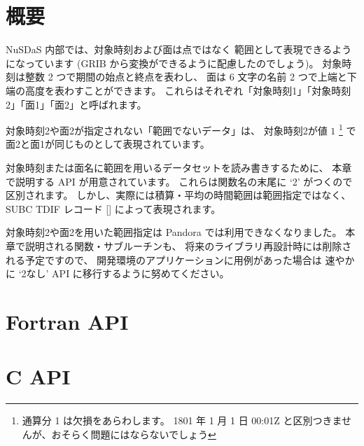 \label{api2}

\section{概要}

NuSDaS 内部では、対象時刻および面は点ではなく
範囲として表現できるようになっています
(GRIB から変換ができるように配慮したのでしょう)。
対象時刻は整数 2 つで期間の始点と終点を表わし、
面は 6 文字の名前 2 つで上端と下端の高度を表わすことができます。
これらはそれぞれ「対象時刻1」「対象時刻2」「面1」「面2」と呼ばれます。

対象時刻2や面2が指定されない「範囲でないデータ」は、
対象時刻2が値 $1$%
\footnote{通算分 1 は欠損をあらわします。
1801 年 1 月 1 日 00:01Z と区別つきませんが、おそらく問題にはならないでしょう}
で面2と面1が同じものとして表現されています。

対象時刻または面名に範囲を用いるデータセットを読み書きするために、
本章で説明する API が用意されています。
これらは関数名の末尾に `2' がつくので区別されます。
しかし、実際には積算・平均の時間範囲は範囲指定ではなく、
SUBC TDIF レコード {}[] によって表現されます。

対象時刻2や面2を用いた範囲指定は Pandora では利用できなくなりました。
本章で説明される関数・サブルーチンも、
将来のライブラリ再設計時には削除される予定ですので、
開発環境のアプリケーションに用例があった場合は
速やかに `2なし' API に移行するように努めてください。

\section{Fortran API}
\label{fapi2}

\renewcommand{\APILabel}[1]{\label{fapi:#1}}




















\section{C API}
\label{capi2}

\renewcommand{\APILabel}[1]{\label{capi:#1}}





















